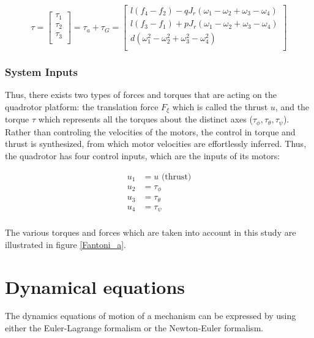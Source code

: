 \documentclass{thesisreport}
\begin{document}
\begin{equation}\label{total_torque_equation}
\tau = \begin{bmatrix}
\tau_1\\
\tau_2\\
\tau_3\\
\end{bmatrix} = \tau_a + \tau_G = \begin{bmatrix}
l(f_4-f_2) - qJ_r(\omega_1-\omega_2+\omega_3-\omega_4)\\
l(f_3-f_1) + pJ_r(\omega_1-\omega_2+\omega_3-\omega_4)\\
d(\omega_1^2-\omega_2^2+\omega_3^2-\omega_4^2)\\
\end{bmatrix}
\end{equation}

\subsubsection*{System Inputs}

Thus, there exists two types of forces and torques that are acting on the quadrotor platform: the translation force $F_{\xi}$ which is called the thrust $u$, and the torque $\tau$ which represents all the torques about the distinct axes ($\tau_{\phi}, \tau_{\theta}, \tau_{\psi} $). \\
Rather than controling the velocities of the motors, the control in torque and thrust is synthesized, from which motor velocities are effortlessly inferred. Thus, the quadrotor has four control inputs, which are the inputs of its motors:

\begin{align*}
u_1 &= u \text{ (thrust)} \\
u_2 &= \tau_{\phi}\\
u_3 &= \tau_{\theta}\\
u_4 &= \tau_{\psi}\\
\end{align*}

The various torques and forces which are taken into account in this study are illustrated in figure \ref{Fantoni_a}.

\newpage

\section{Dynamical equations}

The dynamics equations of motion of a mechanism can be expressed by using either the Euler-Lagrange formalism or the Newton-Euler formalism.
\end{document}

